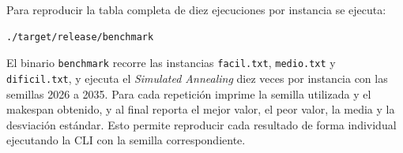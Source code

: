 Para reproducir la tabla completa de diez ejecuciones por instancia se ejecuta:

\begin{verbatim}
./target/release/benchmark
\end{verbatim}

El binario \texttt{benchmark} recorre las instancias \texttt{facil.txt},
\texttt{medio.txt} y \texttt{dificil.txt}, y ejecuta el \emph{Simulated Annealing}
diez veces por instancia con las semillas 2026 a 2035.
Para cada repetición imprime la semilla utilizada y el makespan obtenido, y al final
reporta el mejor valor, el peor valor, la media y la desviación estándar.
Esto permite reproducir cada resultado de forma individual ejecutando la CLI con la semilla correspondiente.
